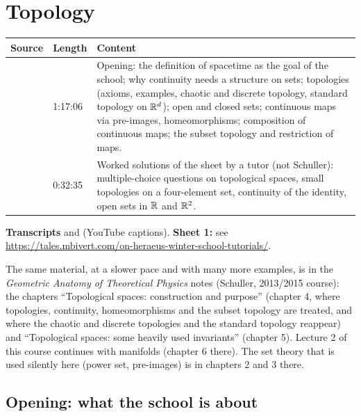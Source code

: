 \chapter{Topology}\label{ch:c01}
\begin{paracol}{2}

\begin{sources}
\begin{tabularx}{\linewidth}{@{}l l L@{}}
\toprule
\textbf{Source} & \textbf{Length} & \textbf{Content}\\
\midrule
{} & 1:17:06 & Opening: the definition of spacetime as the goal of the school; why continuity needs a
structure on sets; topologies (axioms, examples, chaotic and discrete topology, standard topology on $\mathbb{R}^d$); open and closed
sets; continuous maps via pre-images, homeomorphisms; composition of continuous maps; the subset topology and restriction of maps.\\
 & 0:32:35 & Worked solutions of the sheet by a tutor (not Schuller): multiple-choice questions on
topological spaces, small topologies on a four-element set, continuity of the identity, open sets in $\mathbb{R}$ and $\mathbb{R}^2$.\\
\bottomrule
\end{tabularx}

\smallskip
\textbf{Transcripts}  and  (YouTube captions).
\textbf{Sheet 1:} see \url{https://tales.mbivert.com/on-heraeus-winter-school-tutorials/}.
\end{sources}

\begin{reading}
The same material, at a slower pace and with many more examples, is in the \emph{Geometric Anatomy of Theoretical Physics}
notes (Schuller, 2013/2015 course): the chapters ``Topological spaces: construction and purpose'' (chapter 4, where topologies,
continuity, homeomorphisms and the subset topology are treated, and where the chaotic and discrete topologies and the standard
topology reappear) and ``Topological spaces: some heavily used invariants'' (chapter 5). Lecture 2 of this course
continues with manifolds (chapter 6 there). The set theory that is used silently here (power set, pre-images) is in chapters 2
and 3 there.
\end{reading}

\section{Opening: what the school is about}\label{sec:c01-intro}


\end{paracol}
